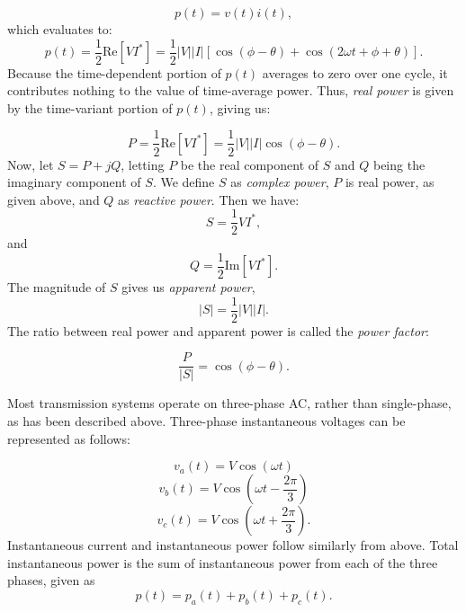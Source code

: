 \begin{equation}
p(t) = v(t)i(t),
\end{equation}
%
which evaluates to:
%
\begin{equation}
p(t) = \frac{1}{2}\mathrm{Re}[VI^*] = \frac{1}{2}\lvert V\rvert \lvert I\rvert [\cos(\phi - \theta)+\cos(2\omega t + \phi + \theta)].
\end{equation}
%
Because the time-dependent portion of $p(t)$ averages to zero over one cycle, it contributes nothing to the value of time-average power.  Thus, \emph{real power} is given by the time-variant portion of $p(t)$, giving us:

\begin{equation}
P = \frac{1}{2}\mathrm{Re}[VI^*] = \frac{1}{2}\lvert V\rvert \lvert I\rvert \cos(\phi - \theta).
\end{equation}
%
Now, let $S = P + jQ$, letting $P$ be the real component of $S$ and $Q$ being the imaginary component of $S$.  We define $S$ as \emph{complex power}, $P$ is real power, as given above, and $Q$ as \emph{reactive power}.  Then we have:
%
\begin{equation}
S = \frac{1}{2} VI^*,
\end{equation}
%
and
%
\begin{equation}
Q = \frac{1}{2}\mathrm{Im}[VI^*].
\end{equation}
%
The magnitude of $S$ gives us \emph{apparent power},
%
\begin{equation}
\lvert S\rvert = \frac{1}{2}\lvert V\rvert \lvert I\rvert.
\end{equation}
%
The ratio between real power and apparent power is called the \emph{power factor}:

\begin{equation}
\frac{P}{\lvert S\rvert}  = \cos(\phi - \theta).
\end{equation}

Most transmission systems operate on three-phase AC, rather than single-phase, as has been described above.  Three-phase instantaneous voltages can be represented as follows:

\begin{equation}
v_a(t) = V\cos(\omega t)
\end{equation}
%
\begin{equation}
v_b(t) = V\cos(\omega t - \frac{2\pi}{3})
\end{equation}
%
\begin{equation}
v_c (t)= V\cos(\omega t +\frac{2\pi}{3}).
\end{equation}
%
Instantaneous current and instantaneous power follow similarly from above.  Total instantaneous power is the sum of instantaneous power from each of the three phases, given as
%
\begin{equation}
p(t) = p_a(t) + p_b(t) + p_c(t).
\end{equation}
%

